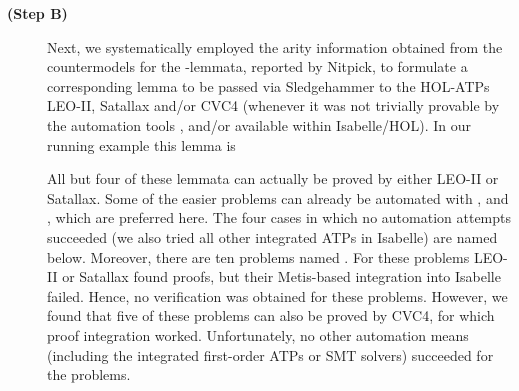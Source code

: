 \begin{isabellebody}
\begin{isamarkuptext}
\begin{description}
\item[\textbf{(Step B)}] Next, we systematically employed the arity information obtained from the countermodels for the -lemmata, reported by Nitpick,
to formulate a corresponding 
lemma to be passed via Sledgehammer to the HOL-ATPs LEO-II, Satallax and/or CVC4 \cite{CVC4} (whenever it was not trivially provable by the automation 
tools ,  and/or  available within Isabelle/HOL).
In our running example this lemma is 
\begin{center}
\end{center}
 All but four of these lemmata can actually be proved by either LEO-II or Satallax. Some of the easier problems can already be automated with 
 ,  and  , which are preferred here.  
 The four cases in which no automation attempts succeeded (we also tried all other integrated ATPs in Isabelle) 
 are named  below.
 Moreover, there are ten problems named . For these problems LEO-II or Satallax found proofs, but their
 Metis-based integration into Isabelle failed. Hence, no verification was obtained for these problems. However, we found that 
 five of these  problems can also be proved by CVC4, for which proof integration
 worked. 
 Unfortunately, no other automation means (including the integrated first-order ATPs or SMT solvers) succeeded for the
  problems.


\end{description}
\end{isamarkuptext}
\end{isabellebody}

